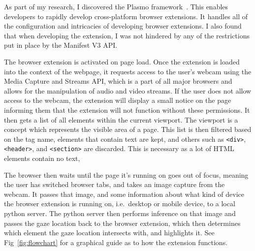 \documentclass[twocolumn]{report}
\begin{document}
As part of my research, I discovered the Plasmo framework~\cite{plasmo}. This enables developers to rapidly develop cross-platform browser extensions. It handles all of the configuration and intricacies of developing browser extensions. I also found that when developing the extension, I was not hindered by any of the restrictions put in place by the Manifest V3 API.

The browser extension is activated on page load. Once the extension is loaded into the context of the webpage, it requests access to the user's webcam using the Media Capture and Streams API, which is a part of all major browsers and allows for the manipulation of audio and video streams. If the user does not allow access to the webcam, the extension will display a small notice on the page informing them that the extension will not function without these permissions. It then gets a list of all elements within the current viewport. The viewport is a concept which represents the visible area of a page. This list is then filtered based on the tag name, elements that contain text are kept, and others such as \texttt{<div>}, \texttt{<header>}, and \texttt{<section>} are discarded. This is necessary as a lot of HTML elements contain no text, 

The browser then waits until the page it's running on goes out of focus, meaning the user has switched browser tabs, and takes an image capture from the webcam. It passes that image, and some information about what kind of device the browser extension is running on, i.e.\ desktop or mobile device, to a local python server. The python server then performs inference on that image and passes the gaze location back to the browser extension, which then determines which element the gaze location intersects with, and highlights it. See Fig~\ref{fig:flowchart} for a graphical guide as to how the extension functions. 
\end{document}
